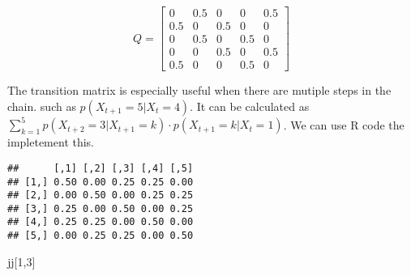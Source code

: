 \documentclass[]{book}
\newenvironment{Shaded}{\begin{snugshade}}{\end{snugshade}}
\newcommand{\DataTypeTok}[1]{\textcolor[rgb]{0.13,0.29,0.53}{#1}}
\newcommand{\DecValTok}[1]{\textcolor[rgb]{0.00,0.00,0.81}{#1}}
\newcommand{\FloatTok}[1]{\textcolor[rgb]{0.00,0.00,0.81}{#1}}
\newcommand{\KeywordTok}[1]{\textcolor[rgb]{0.13,0.29,0.53}{\textbf{#1}}}
\newcommand{\NormalTok}[1]{#1}
\newcommand{\OperatorTok}[1]{\textcolor[rgb]{0.81,0.36,0.00}{\textbf{#1}}}
\newcommand{\OtherTok}[1]{\textcolor[rgb]{0.56,0.35,0.01}{#1}}
\newcommand{\StringTok}[1]{\textcolor[rgb]{0.31,0.60,0.02}{#1}}
\begin{document}
\[Q=\begin{bmatrix} 0 & 0.5 & 0 & 0 & 0.5 \\ 0.5 & 0 & 0.5 & 0 & 0\\ 0 & 0.5 & 0 & 0.5 & 0 \\ 0& 0 & 0.5& 0& 0.5\\ 0.5 & 0& 0 &0.5 & 0 \end{bmatrix}\]

The transition matrix is especially useful when there are mutiple steps in the chain. such as \(p(X_{t+1}=5| X_t=4)\). It can be calculated as \(\sum_{k=1}^{5} p(X_{t+2}=3|X_{t+1}=k) \cdot p(X_{t+1}=k |X_t=1)\). We can use R code the impletement this.

\begin{Shaded}
\end{Shaded}

\begin{verbatim}
##      [,1] [,2] [,3] [,4] [,5]
## [1,] 0.50 0.00 0.25 0.25 0.00
## [2,] 0.00 0.50 0.00 0.25 0.25
## [3,] 0.25 0.00 0.50 0.00 0.25
## [4,] 0.25 0.25 0.00 0.50 0.00
## [5,] 0.00 0.25 0.25 0.00 0.50
\end{verbatim}

\begin{Shaded}
\begin{Highlighting}[]
\NormalTok{jj[}\DecValTok{1}\NormalTok{,}\DecValTok{3}\NormalTok{]}
\end{Highlighting}
\end{Shaded}
\end{document}
